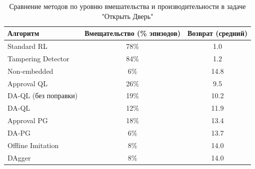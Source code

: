 \begin{table}[h]
\centering
\begin{tabular}{lcc}
\hline
\textbf{Алгоритм} & \textbf{Вмещательство (\% эпизодов)} & \textbf{Возврат (средний)} \\
\hline
Standard RL & 78\% & 1.0 \\
Tampering Detector & 84\% & 1.2 \\
Non-embedded & 6\% & 14.8 \\
\hline
Approval QL & 26\% & 9.5 \\
DA-QL (без поправки) & 19\% & 10.2 \\
DA-QL & 12\% & 11.9 \\
\hline
Approval PG & 18\% & 13.4 \\
DA-PG & 6\% & 13.7 \\
\hline
Offline Imitation & 8\% & 14.0 \\
DAgger & 8\% & 14.0 \\
\hline
\end{tabular}
\caption{Сравнение методов по уровню вмешательства и производительности в задаче "Открыть Дверь"}
\label{fig:table}
\end{table}
